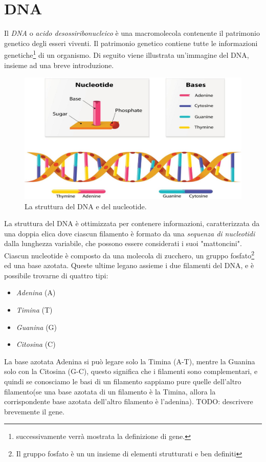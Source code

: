 \section{DNA}
Il \textit{DNA} o \textit{acido desossiribonucleico} è una macromolecola contenente il patrimonio genetico degli esseri viventi. Il patrimonio genetico contiene tutte le informazioni genetiche\footnote{successivamente verrà mostrata la definizione di gene.} di un organismo.
\newline
Di seguito viene illustrata un'immagine del DNA, insieme ad una breve introduzione.
\newline
\begin{figure}[h!]
	\includegraphics[width=\linewidth]{DNAStructure.jpg}
 	\caption{La struttura del DNA e del nucleotide.}
  	\label{fig:DnaAndNucleotideStructure}
\end{figure}
\newline
La struttura del DNA è ottimizzata per contenere informazioni, caratterizzata da una doppia elica dove ciascun filamento è formato da una \textit{sequenza di nucleotidi} dalla lunghezza variabile, che possono essere considerati i suoi "mattoncini".
\newline
Ciascun nucleotide è composto da una molecola di zucchero, un gruppo fosfato\footnote{Il gruppo fosfato è un un insieme di elementi strutturati e ben definiti} ed una base azotata. Queste ultime legano assieme i due filamenti del DNA, e è possibile trovarne di quattro tipi:
\begin{itemize}
	\item \textit{Adenina} (A)
	\item \textit{Timina} (T)
	\item \textit{Guanina} (G)
	\item \textit{Citosina} (C)
\end{itemize}
La base azotata Adenina si può legare solo la Timina (A-T), mentre la Guanina solo con la Citosina (G-C), questo significa che i filamenti sono complementari, e quindi se conosciamo le basi di un filamento sappiamo pure quelle dell'altro filamento(se una base azotata di un filamento è la Timina, allora la corrispondente base azotata dell'altro filamento è l'adenina).
TODO: descrivere brevemente il gene.


